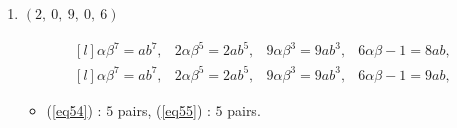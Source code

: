 \documentclass[12pt,a4wide, reqno]{amsart}
\theoremstyle{definition}
\theoremstyle{remark}
\numberwithin{equation}{section}
\begin{document}
\begin{enumerate}[label=\textbf{(\arabic*)}]
\begin{itemize}
    \item 
    (\ref{eq46}) : $5$ pairs, (\ref{eq47}) : $5$ pairs.
   \end{itemize}

     \item 
     $(2,~0,~9,~0,~6)$ 

\begin{equation}\label{eq54}
    \begin{matrix*}[l]
          \alpha \beta ^7=ab^7, & 2\alpha \beta ^5=2ab^5, & 9\alpha \beta ^3=9ab ^3, & 6\alpha\beta-1=8ab,
    \end{matrix*}
\end{equation}
\begin{equation}\label{eq55}
    \begin{matrix*}[l]
          \alpha \beta ^7=ab^7, & 2\alpha \beta ^5=2ab^5, & 9\alpha \beta ^3=9ab^3, & 6\alpha\beta-1=9ab,
    \end{matrix*}
\end{equation}

\begin{itemize}
    \item 
    (\ref{eq54}) : $5$ pairs, (\ref{eq55}) : $5$ pairs.
    
    \end{itemize}
    
\end{enumerate}
\end{document}
